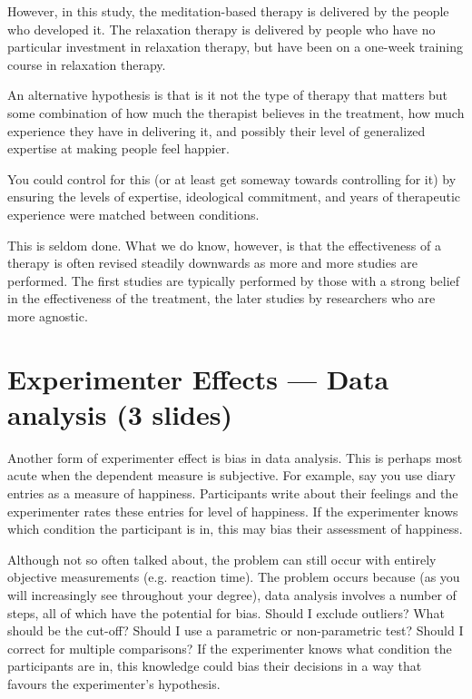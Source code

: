 \documentclass[12pt]{article}
\begin{document}
However, in this study, the meditation-based therapy is delivered by
the people who developed it. The relaxation therapy is delivered by
people who have no particular investment in relaxation therapy, but
have been on a one-week training course in relaxation therapy.

An alternative hypothesis is that is it not the type of therapy that
matters but some combination of how much the therapist believes in the
treatment, how much experience they have in delivering it, and
possibly their level of generalized expertise at making people feel
happier.

You could control for this (or at least get someway towards
controlling for it) by ensuring the levels of expertise, ideological
commitment, and years of therapeutic experience were matched between
conditions.

This is seldom done. What we do know, however, is that the
effectiveness of a therapy is often revised steadily downwards as more
and more studies are performed. The first studies are typically
performed by those with a strong belief in the effectiveness of the
treatment, the later studies by researchers who are more agnostic.


\section{Experimenter Effects --- Data analysis (3 slides)}

Another form of experimenter effect is bias in data analysis. This is
perhaps most acute when the dependent measure is subjective. For
example, say you use diary entries as a measure of
happiness. Participants write about their feelings and the
experimenter rates these entries for level of happiness. If the
experimenter knows which condition the participant is in, this may
bias their assessment of happiness.

Although not so often talked about, the problem can still occur with
entirely objective measurements (e.g. reaction time). The problem
occurs because (as you will increasingly see throughout your degree),
data analysis involves a number of steps, all of which have the
potential for bias. Should I exclude outliers? What should be the
cut-off? Should I use a parametric or non-parametric test? Should I
correct for multiple comparisons? If the experimenter knows what
condition the participants are in, this knowledge could bias their
decisions in a way that favours the experimenter's hypothesis.
\end{document}
